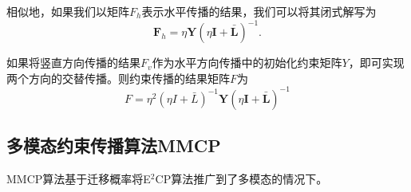 相似地，如果我们以矩阵$F_h$表示水平传播的结果，我们可以将其闭式解写为
\begin{equation}
\mathbf{F}_h = \eta\mathbf{Y}(\eta\mathbf{I}+\bar{\mathbf{L}})^{-1}.
\end{equation}

如果将竖直方向传播的结果$F_v$作为水平方向传播中的初始化约束矩阵$Y$，即可实现两个方向的交替传播。则约束传播的结果矩阵$F$为
\begin{equation}
{F} = \eta^2(\eta{I}+\bar{{L}})^{-1}\mathbf{Y}(\eta\mathbf{I}+\bar{\mathbf{L}})^{-1}
\label{eq3:e2cp}
\end{equation}

\subsection{多模态约束传播算法MMCP}
MMCP算法基于迁移概率将E$^2$CP算法推广到了多模态的情况下。